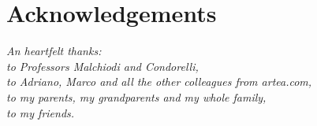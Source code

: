\documentclass[\main/main.tex]{subfiles}
\begin{document}
\chapter*{Acknowledgements}
\begin{flushright}
\emph{An heartfelt thanks:\\
to Professors Malchiodi and Condorelli, \\
to Adriano, Marco and all the other colleagues from artea.com, \\
to my parents, my grandparents and my whole family, \\
to my friends.}
\end{flushright}
\end{document}
